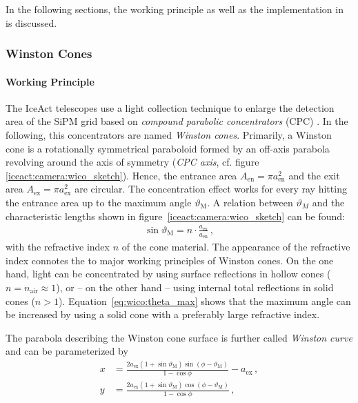 
In the following sections, the working principle as well as the implementation in \geant is discussed.

\subsubsection{Winston Cones}\label{sec:winstoncones}

\paragraph{Working Principle}

The IceAct telescopes use a light collection technique to enlarge the detection area of the SiPM grid based on \textit{compound parabolic concentrators} (CPC) \cite{wico:book}. In the following, this concentrators are named \textit{Winston cones}. 
Primarily, a Winston cone is a rotationally symmetrical paraboloid formed by an off-axis parabola revolving around the axis of symmetry (\textit{CPC axis}, cf. figure \ref{iceact:camera:wico_sketch}). Hence, the entrance area $A_\text{en}=\pi a_\text{en}^2$ and the exit area $A_\text{ex}=\pi a_\text{ex}^2$ are circular. The concentration effect works for every ray hitting the entrance area up to the maximum angle $\vartheta_\text{M}$. A relation between $\vartheta_M$ and the characteristic lengths shown in figure~\ref{iceact:camera:wico_sketch} can be found: \cite{wico:book,iceact:camera}
\begin{align}
	\sin\vartheta_\text{M} = n\cdot\frac{a_\text{ex}}{a_\text{en}}\,,
	\label{eq:wico:theta_max}
\end{align}
with the refractive index $n$ of the cone material. The appearance of the refractive index connotes the to major working principles of Winston cones. On the one hand, light can be concentrated by using surface reflections in hollow cones ($n=n_\text{air}\approx 1$), or -- on the other hand -- using internal total reflections in solid cones ($n>1$). Equation~\eqref{eq:wico:theta_max} shows that the maximum angle can be increased by using a solid cone with a preferably large refractive index.

The parabola describing the Winston cone surface is further called \textit{Winston curve} and can be parameterized by \cite{wico:book,iceact:camera}
\begin{subequations}
	\label{eq:wico:param}
	\begin{align}
	x &= \frac{2a_\text{ex}(1+\sin\vartheta_\text{M})\sin(\phi-\vartheta_\text{M})}{1-\cos\phi}-a_\text{ex}\,,\\
	y &= \frac{2a_\text{ex}(1+\sin\vartheta_\text{M})\cos(\phi-\vartheta_\text{M})}{1-\cos\phi}\,,
	\end{align}
\end{subequations}

